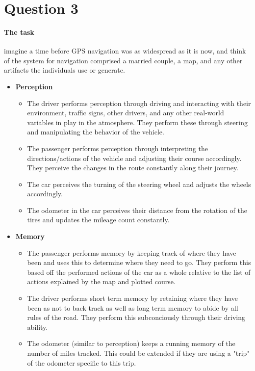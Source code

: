 \section{Question 3}

\paragraph{The task} imagine a time before GPS navigation was as widespread as it is now, and think of the system for navigation comprised a married couple, a map, and any other artifacts the individuals use or generate.

\begin{itemize}
\item
  \textbf{Perception}
  \begin{itemize}
  \item
    The driver performs perception through driving and interacting with their environment, traffic signs, other drivers, and any other real-world variables in play in the atmosphere. They perform these through steering and manipulating the behavior of the vehicle.
  \item
    The passenger performs perception through interpreting the directions/actions of the vehicle and adjusting their course accordingly. They perceive the changes in the route constantly along their journey.
  \item
    The car perceives the turning of the steering wheel and adjusts the wheels accordingly.
  \item
    The odometer in the car perceives their distance from the rotation of the tires and updates the mileage count constantly.
  \end{itemize}
\item
  \textbf{Memory}
  \begin{itemize}
  \item
    The passenger performs memory by keeping track of where they have been and uses this to determine where they need to go. They perform this based off the performed actions of the car as a whole relative to the list of actions explained by the map and plotted course.
  \item
    The driver performs short term memory by retaining where they have been as not to back track as well as long term memory to abide by all rules of the road. They perform this subconciously through their driving ability.
  \item
    The odometer (similar to perception) keeps a running memory of the number of miles tracked. This could be extended if they are using a "trip" of the odometer specific to this trip.

\end{itemize}
\end{itemize}
